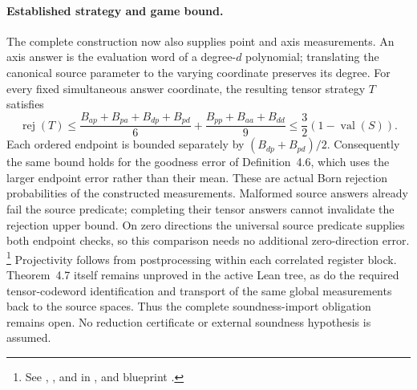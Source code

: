 \documentclass[11pt]{article}
\begin{document}
\paragraph{Established strategy and game bound.}
The complete construction now also supplies point and axis measurements.
An axis answer is the evaluation word of a degree-$d$ polynomial; translating
the canonical source parameter to the varying coordinate preserves its degree.
For every fixed simultaneous answer coordinate, the resulting tensor strategy
$T$ satisfies
\[
 \operatorname{rej}(T)\leq
 \frac{B_{ap}+B_{pa}+B_{dp}+B_{pd}}6+
 \frac{B_{pp}+B_{aa}+B_{dd}}9
 \leq\frac32(1-\operatorname{val}(S)).
\]
Each ordered endpoint is bounded separately by $(B_{dp}+B_{pd})/2$.
Consequently the same bound holds for the goodness error of Definition~4.6,
which uses the larger endpoint error rather than their mean. These are actual
Born rejection probabilities of the constructed measurements. Malformed source
answers already fail the source predicate; completing their tensor answers
cannot invalidate the rejection upper bound. On zero directions the universal
source predicate supplies both endpoint checks, so this comparison needs no
additional zero-direction error.%
\footnote{See ,
, and
 in
, and blueprint
.}
Projectivity follows from postprocessing within each correlated register block.
Theorem~4.7 itself remains unproved in the active Lean tree, as do the required
tensor-codeword identification and transport of the same global measurements
back to the source spaces. Thus the complete soundness-import obligation
remains open. No reduction certificate or external soundness hypothesis is assumed.
\end{document}
